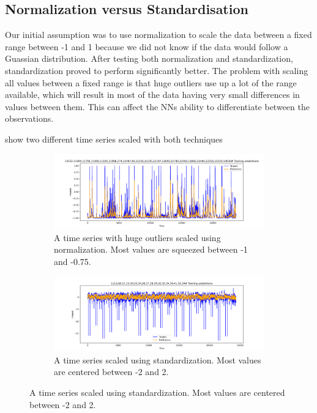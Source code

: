 \subsection{Normalization versus Standardisation}
Our initial assumption was to use normalization to scale the data between a
fixed range between -1 and 1 because we did not know if the data would follow a Guassian
distribution. After testing both normalization and standardization,
standardization proved to perform significantly better.
The problem with scaling all values between a fixed range is that huge
outliers use up a lot of the range available, which will result in
most of the data having very small differences in values between them.
This can affect the NNs ability to differentiate between the observations.

 show two different time series
scaled with both techniques
\begin{figure}[h!]
  \centering
  \caption{Effects of different scaling techniques on a dataset with huge outliers.}
  \label{fig:time-series-standardization-vs-normalization}
  \begin{subfigure}[b]{0.49\textwidth}
    \includegraphics[width=\textwidth]{./figs/dataset/time-series_scaled_normalization2.png}
    \hfill
    \caption{A time series with huge outliers scaled using normalization. Most values are squeezed between -1 and -0.75.}
    \label{fig:time-series-normalization}
  \end{subfigure}
  \begin{subfigure}[b]{0.49\textwidth}
    \includegraphics[width=\textwidth]{./figs/dataset/time-series_scaled_standardization.png}
    \hfill
    \caption{A time series scaled using standardization. Most values are centered between -2 and 2.}
    \label{fig:time-series-standardization}
  \end{subfigure}
\end{figure}

